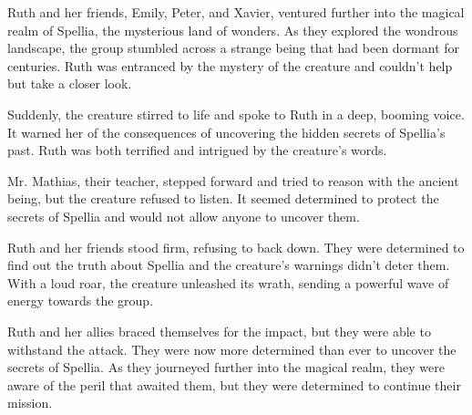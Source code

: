 

Ruth and her friends, Emily, Peter, and Xavier, ventured further into the magical realm of Spellia, the mysterious land of wonders. As they explored the wondrous landscape, the group stumbled across a strange being that had been dormant for centuries. Ruth was entranced by the mystery of the creature and couldn’t help but take a closer look.

Suddenly, the creature stirred to life and spoke to Ruth in a deep, booming voice. It warned her of the consequences of uncovering the hidden secrets of Spellia’s past. Ruth was both terrified and intrigued by the creature’s words.

Mr. Mathias, their teacher, stepped forward and tried to reason with the ancient being, but the creature refused to listen. It seemed determined to protect the secrets of Spellia and would not allow anyone to uncover them.

Ruth and her friends stood firm, refusing to back down. They were determined to find out the truth about Spellia and the creature’s warnings didn’t deter them. With a loud roar, the creature unleashed its wrath, sending a powerful wave of energy towards the group.

Ruth and her allies braced themselves for the impact, but they were able to withstand the attack. They were now more determined than ever to uncover the secrets of Spellia. As they journeyed further into the magical realm, they were aware of the peril that awaited them, but they were determined to continue their mission.